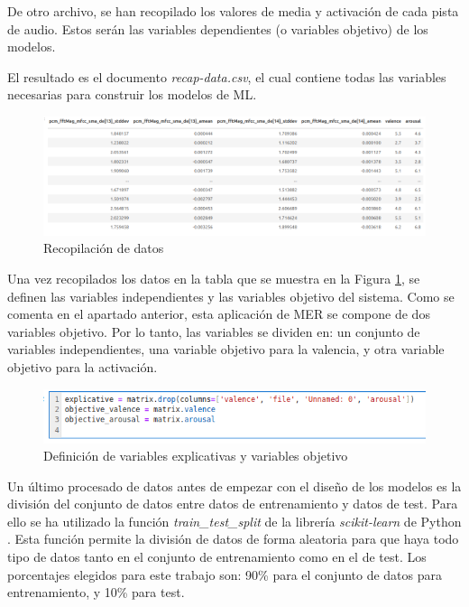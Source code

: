 \documentclass[12pt,a4paper,Spanish]{article}
\begin{document}
De otro archivo, se han recopilado los valores de media y activación de cada pista de audio. Estos serán las variables dependientes (o variables objetivo) de los modelos.
\newline

El resultado es el documento \textit{recap-data.csv}, el cual contiene todas las variables necesarias para construir los modelos de ML.

\begin{figure}[H]
	\centering
	\includegraphics[width=0.9\linewidth]{figs/data}
	\caption{Recopilación de datos}
	\label{fig:data}
\end{figure}
Una vez recopilados los datos en la tabla que se muestra en la Figura \ref{fig:data}, se definen las variables independientes y las variables objetivo del sistema. Como se comenta en el apartado anterior, esta aplicación de MER se compone de dos variables objetivo. Por lo tanto, las variables se dividen en: un conjunto de variables independientes, una variable objetivo para la valencia, y otra variable objetivo para la activación.
\begin{figure}[H]
	\centering
	\includegraphics[width=0.8\linewidth]{figs/variables}
	\caption{Definición de variables explicativas y variables objetivo}
	\label{fig:variables}
\end{figure}
Un último procesado de datos antes de empezar con el diseño de los modelos es la división del conjunto de datos entre datos de entrenamiento y datos de test. Para ello se ha utilizado la función \textit{train\_test\_split} de la librería \textit{scikit-learn} de Python \cite{scikit-learn}. Esta función permite la división de datos de forma aleatoria para que haya todo tipo de datos tanto en el conjunto de entrenamiento como en el de test. Los porcentajes elegidos para este trabajo son: 90\% para el conjunto de datos para entrenamiento, y 10\% para test.
\newline
\end{document}
